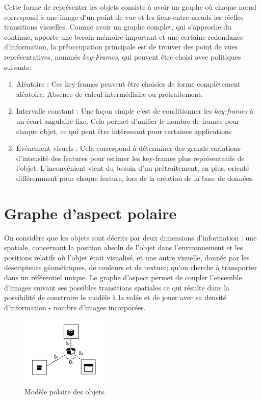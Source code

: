 Cette forme de représenter les objets consiste à avoir un graphe où
chaque nœud correspond à une image d'un point de vue et les liens
entre nœuds les réelles transitions visuelles. Comme avoir un graphe
complet, qui s'approche du continue, apporte une besoin mémoire
important et une certaine redondance d'information, la préoccupation
principale est de trouver des point de vues représentatives, nommés
\textit{key-Frames}, qui peuvent être choisi avec politiques suivants:
\begin{enumerate}
\item Aléatoire : Ces key-frames peuvent être choisies de forme
  complètement aléatoire. Absence de calcul intermédiaire ou
  prétraitement.

\item Intervalle constant : Une façon simple c'est de conditionner les
  \textit{key-frames} à un écart angulaire fixe. Cela permet d'unifier
  le nombre de frames pour chaque objet, ce qui peut être intéressant
  pour certaines applications

\item Événement visuels : Cela correspond à déterminer des grands
  variations d'intensité des features pour estimer les key-frames plus
  représentatifs de l'objet. L'inconvénient vient du besoin d'un
  prétraitement, en plus, orienté différemment pour chaque feature,
  lors de la création de la base de données.

\end{enumerate}

\section {Graphe d'aspect polaire}

On considère que les objets sont décrits par deux dimensions
d'information : une spatiale, concernant la position absolu de l'objet
dans l'environnement et les positions relatifs où l'objet était
visualisé, et une autre visuelle, donnée par les descripteurs
géométriques, de couleurs et de texture; qu'on cherche à transporter
dans un référentiel unique. Le graphe d'aspect permet de coupler
l'ensemble d'images suivant ses possibles transitions spatiales ce qui
résulte dans la possibilité de construire le modèle à la volée et de
jouer avec sa densité d'information - nombre d'images incorporées.

\begin{figure}[H]
  \centering
  \includegraphics[width=0.4\textwidth]{object_model.png}
  \caption{Modèle polaire des objets.}
\end{figure}

